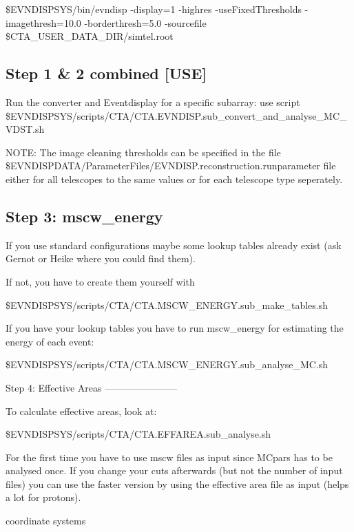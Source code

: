 \documentclass[titlepage,a4paper,twoside,11pt]{report}
\begin{document}
\$EVNDISPSYS/bin/evndisp -display=1 -highres -useFixedThresholds -imagethresh=10.0 -borderthresh=5.0 -sourcefile \$CTA\_USER\_DATA\_DIR/simtel.root

\subsection{Step 1 \& 2 combined [USE]}

Run the converter and Eventdisplay for a specific subarray: use script \$EVNDISPSYS/scripts/CTA/CTA.EVNDISP.sub\_convert\_and\_analyse\_MC\_VDST.sh

NOTE: The image cleaning thresholds can be specified in the file \$EVNDISPDATA/ParameterFiles/EVNDISP.reconstruction.runparameter file either
for all telescopes to the same values or for each telescope type seperately. 

\subsection{Step 3: mscw\_energy}

If you use standard configurations maybe some lookup tables already exist (ask Gernot or Heike where you could find them).

If not, you have to create them yourself with

\$EVNDISPSYS/scripts/CTA/CTA.MSCW\_ENERGY.sub\_make\_tables.sh

If you have your lookup tables you have to run mscw\_energy for estimating the energy of each event: 

\$EVNDISPSYS/scripts/CTA/CTA.MSCW\_ENERGY.sub\_analyse\_MC.sh

Step 4: Effective Areas
-----------------------

To calculate effective areas, look at:

\$EVNDISPSYS/scripts/CTA/CTA.EFFAREA.sub\_analyse.sh

For the first time you have to use mscw files as input since MCpars has to be analysed once. 
If you change your cuts afterwards (but not the number of input files) you can use the faster version by using
the effective area file as input (helps a lot for protons).




\begin{appendix}
 coordinate systems
\end{appendix}


%
%
%

\end{document}
